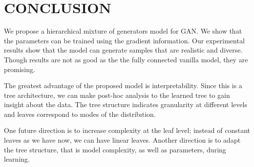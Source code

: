 \documentclass[a4paper,onesided,12pt]{report}
\begin{document}
\chapter{CONCLUSION}
\label{chapter:conc}
We propose a hierarchical mixture of generators model for GAN. We show that the parameters can be trained using the gradient information. Our experimental results show that the model can generate samples that are realistic and diverse. Though results are not as good as the the fully connected vanilla model, they are promising.

The greatest advantage of the proposed model is interpretability. Since this is a tree architecture, we can make post-hoc analysis to the learned tree to gain insight about the data. The tree structure indicates granularity at different levels and leaves correspond to modes of the distribıtion.

One future direction is to increase complexity at the leaf level; instead of constant leaves as we have now, we can have linear leaves. Another direction is to adapt the tree structure, that is model complexity, as well as parameters, during learning.



\end{document}
